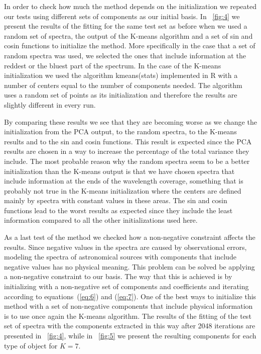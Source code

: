 \documentclass[12pt,preprint]{aastex}
\newcommand{\equationname}{equation}
\begin{document}
In order to check how much the method depends on the initialization we
repeated our tests using different sets of components as our initial
basis. In \figurename~\ref{fig:4} we present the results of the
fitting for the same test set as before when we used a random set of
spectra, the output of the K-means algorithm and a set of sin and
cosin functions to initialize the method. More specifically in the
case that a set of random spectra was used, we selected the ones that
include information at the reddest or the bluest part of the
spectrum. In the case of the K-means initialization we used the
algorithm kmeans(stats) implemented in R with a number of centers
equal to the number of components needed. The algorithm uses a random
set of points as its initialization and therefore the results are
slightly different in every run.

By comparing these results we see that they are becoming worse as we
change the initialization from the PCA output, to the random spectra,
to the K-means results and to the sin and cosin functions. This result
is expected since the PCA results are chosen in a way to increase the
percentage of the total variance they include. The most probable
reason why the random spectra seem to be a better initialization than
the K-means output is that we have chosen spectra that include
information at the ends of the wavelength coverage, something that is
probably not true in the K-means initialization where the centers are
defined mainly by spectra with constant values in these areas. The sin
and cosin functions lead to the worst results as expected since they
include the least information compared to all the other
initializations used here.

As a last test of the method we checked how a non-negative constraint
affects the results. Since negative values in the spectra are caused
by observational errors, modeling the spectra of astronomical sources
with components that include negative values has no physical
meaning. This problem can be solved be applying a non-negative
constraint to our basis. The way that this is achieved is by
initializing with a non-negative set of components and coefficients
and iterating according to {\equationname}s~(\ref{eq:6}) and
(\ref{eq:7}). One of the best ways to initialize this method with a
set of non-negative components that include physical information is to
use once again the K-means algorithm. The results of the fitting of
the test set of spectra with the components extracted in this way
after 2048 iterations are presented in \figurename~\ref{fig:4}, while
in \figurename~\ref{fig:5} we present the resulting components for
each type of object for $K=7$.
\end{document}
